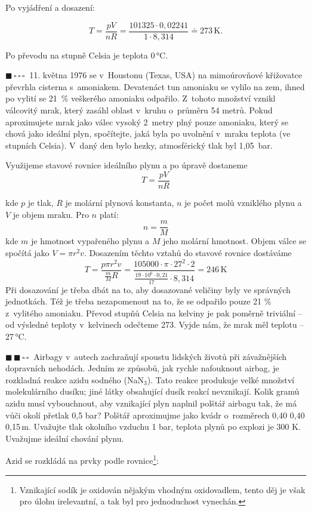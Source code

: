 \documentclass{book}
\newcommand{\jeden}{$\blacksquare \, \square \, \square \, \square \; \; $}
\newcommand{\dva}{$\blacksquare \, \blacksquare \, \square \, \square \; \; $}
\renewenvironment{quotation}{\par}{\par} %
\begin{document}
Po vyjádření a dosazení:

\[
T=\frac{pV}{nR}=\frac{101325\cdot0,02241}{1\cdot8,314}\doteq273\,\mathrm{K}.
\]

Po převodu na stupně Celsia je teplota 0\,°C.

\hrulefill %
\begin{quotation}
\jeden 11. května 1976 se v~Houstonu (Texas, USA) na mimoúrovňové křižovatce
převrhla cisterna s~amoniakem. Devatenáct tun amoniaku se vylilo na
zem, ihned po vylití se 21~\% veškerého amoniaku odpařilo. Z~tohoto
množství vznikl válcovitý mrak, který zasáhl oblast v~kruhu o~průměru
54 metrů. Pokud aproximujete mrak jako válec vysoký 2~metry plný pouze
amoniaku, který se chová jako ideální plyn, spočítejte, jaká byla
po uvolnění v~mraku teplota (ve stupních Celsia). V~daný den bylo
hezky, atmosférický tlak byl 1,05~bar. 
\end{quotation} \dotfill \par 
Využijeme stavové rovnice ideálního plynu a po úpravě dostaneme 
\[
T=\frac{pV}{nR}
\]

kde $p$ je tlak, $R$ je molární plynová konstanta, $n$ je počet molů vzniklého
plynu a $V$ je objem mraku. Pro $n$ platí: 
\[
n=\frac{m}{M}
\]
kde $m$ je hmotnost vypařeného plynu a $M$ jeho molární hmotnost. Objem válce
se spočítá jako $V=\pi r^{2}v$. Dosazením těchto vztahů do stavové rovnice dostáváme
\[
T=\frac{p\pi r^{2}v}{\frac{m}{M}R} = \frac{105000 \cdot \pi\cdot 27^{2}\cdot 2}{\frac{19\cdot 10^6 \cdot 0,21}{17}\cdot 8,314} =246 \, \mathrm{K}
\]
Při dosazování je třeba dbát na to, aby dosazované veličiny byly ve správných jednotkách. Též je třeba nezapomenout na to, že se odpařilo pouze 21 \% z~vylitého amoniaku.
Převod stupňů Celsia na kelviny je pak poměrně triviální -- od výsledné teploty v~kelvinech odečteme 273. Vyjde nám, že mrak měl teplotu --27\,°C.

\newpage %
\begin{quotation}
\dva Airbagy v~autech zachraňují spoustu lidských životů při závažnějších
dopravních nehodách. Jedním ze způsobů, jak rychle nafouknout airbag,
je rozkladná reakce azidu sodného (NaN$_{3}$). Tato reakce produkuje
velké množství molekulárního dusíku; jiné látky obsahující dusík reakcí
nevznikají. Kolik gramů azidu musí vybouchnout, aby vznikající plyn
naplnil polštář airbagu tak, že má vůči okolí přetlak 0,5 bar? Polštář
aproximujme jako kvádr o~rozměrech 0,40 \texttimes{} 0,40 \texttimes{}
0,15\,m. Uvažujte tlak okolního vzduchu 1 bar, teplota plynů po explozi
je 300 K. Uvažujme ideální chování plynu.
\end{quotation} \dotfill \par 
Azid se rozkládá na prvky podle rovnice\footnote{Vznikající sodík je oxidován nějakým vhodným oxidovadlem, tento děj
je však pro úlohu irelevantní, a tak byl pro jednoduchost vynechán.}:
\end{document}
